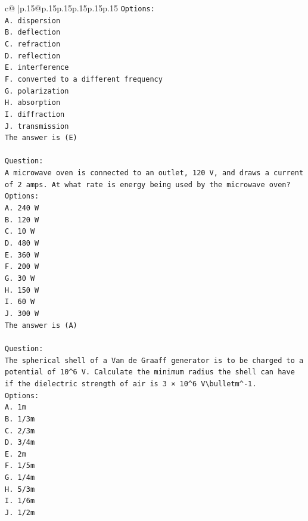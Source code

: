 \documentclass{article}
\begin{document}
{\begin{supertabular}{c@{$\;$}|p{.15\linewidth}@{}p{.15\linewidth}p{.15\linewidth}p{.15\linewidth}p{.15\linewidth}p{.15\linewidth}}
{{{\texttt{Options:} \\
\texttt{A. dispersion} \\
\texttt{B. deflection} \\
\texttt{C. refraction} \\
\texttt{D. reflection} \\
\texttt{E. interference} \\
\texttt{F. converted to a different frequency} \\
\texttt{G. polarization} \\
\texttt{H. absorption} \\
\texttt{I. diffraction} \\
\texttt{J. transmission} \\
\texttt{The answer is (E)} \\
\\ 
\texttt{Question:} \\
\texttt{A microwave oven is connected to an outlet, 120 V, and draws a current of 2 amps. At what rate is energy being used by the microwave oven?} \\
\texttt{Options:} \\
\texttt{A. 240 W} \\
\texttt{B. 120 W} \\
\texttt{C. 10 W} \\
\texttt{D. 480 W} \\
\texttt{E. 360 W} \\
\texttt{F. 200 W} \\
\texttt{G. 30 W} \\
\texttt{H. 150 W} \\
\texttt{I. 60 W} \\
\texttt{J. 300 W} \\
\texttt{The answer is (A)} \\
\\ 
\texttt{Question:} \\
\texttt{The spherical shell of a Van de Graaff generator is to be charged to a potential of 10\^{}6 V. Calculate the minimum radius the shell can have if the dielectric strength of air is 3 × 10\^{}6 V\textbackslash{}bulletm\^{}{-}1.} \\
\texttt{Options:} \\
\texttt{A. 1m} \\
\texttt{B. 1/3m} \\
\texttt{C. 2/3m} \\
\texttt{D. 3/4m} \\
\texttt{E. 2m} \\
\texttt{F. 1/5m} \\
\texttt{G. 1/4m} \\
\texttt{H. 5/3m} \\
\texttt{I. 1/6m} \\
\texttt{J. 1/2m} \\
            }
        }
    }
     \\ \\


\end{supertabular}}
\end{document}
